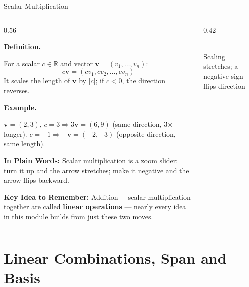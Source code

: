 \documentclass[9pt,aspectratio=169]{beamer}
\newcommand{\keyidea}[1]{%
\par\medskip\noindent\textbf{Key Idea to Remember:} #1\par\medskip}
\newcommand{\childex}[1]{%
\par\medskip\noindent\textbf{In Plain Words:} #1\par\medskip}
\begin{document}
\begin{frame}{Scalar Multiplication}
\footnotesize
\begin{columns}[T]
\begin{column}{0.56\textwidth}
\par\noindent\textbf{Definition.}\par
For a scalar $c \in \mathbb{R}$ and vector $\mathbf{v}=(v_1,\dots,v_n)$:
\[ c\mathbf{v} = (cv_1, cv_2, \dots, cv_n) \]
It scales the length of $\mathbf{v}$ by $|c|$; if $c<0$, the direction reverses.
\medskip

\par\noindent\textbf{Example.}\par
$\mathbf{v}=(2,3)$, $c=3 \Rightarrow 3\mathbf{v}=(6,9)$ (same direction, 3$\times$ longer).
$c=-1 \Rightarrow -\mathbf{v}=(-2,-3)$ (opposite direction, same length).
\medskip

\childex{Scalar multiplication is a zoom slider: turn it up and the arrow stretches; make
it negative and the arrow flips backward.}

\keyidea{Addition + scalar multiplication together are called \textbf{linear operations}
--- nearly every idea in this module builds from just these two moves.}
\end{column}
\begin{column}{0.42\textwidth}
\centering
{}
\\[0.3em]{\scriptsize Scaling stretches; a negative sign flips direction}
\end{column}
\end{columns}
\end{frame}

\section{Linear Combinations, Span and Basis}
\end{document}
